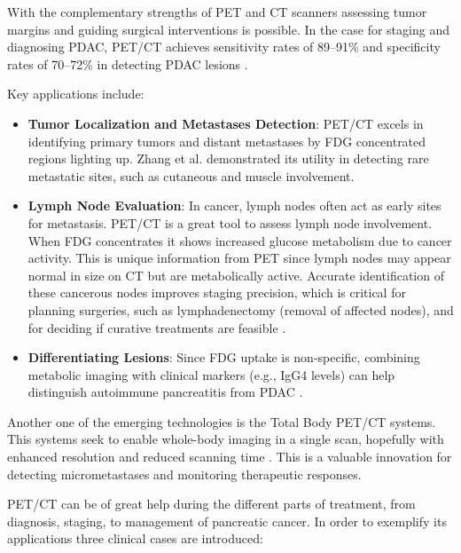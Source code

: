 \begin{multicols}{2}


With the complementary strengths of PET and CT scanners assessing tumor margins and guiding surgical interventions is possible. In the case for staging and diagnosing PDAC, PET/CT achieves sensitivity rates of 89–91\% and specificity rates of 70–72\% in detecting PDAC lesions \cite{TG174}.

Key applications include:
\begin{itemize}
	\item \textbf{Tumor Localization and Metastases Detection}: PET/CT excels in identifying primary tumors and distant metastases by FDG concentrated regions lighting up. Zhang et al. demonstrated its utility in detecting rare metastatic sites, such as cutaneous and muscle involvement\cite{Zhang2023}.
	\item \textbf{Lymph Node Evaluation}: In cancer, lymph nodes often act as early sites for metastasis. PET/CT is a great tool to assess lymph node involvement. When FDG concentrates it shows increased glucose metabolism due to cancer activity. This is unique information from PET since lymph nodes may appear normal in size on CT but are metabolically active. Accurate identification of these cancerous nodes improves staging precision, which is critical for planning surgeries, such as lymphadenectomy (removal of affected nodes), and for deciding if curative treatments are feasible \cite{TG174}.
	\item \textbf{Differentiating Lesions}: Since FDG uptake is non-specific, combining metabolic imaging with clinical markers (e.g., IgG4 levels) can help distinguish autoimmune pancreatitis from PDAC \cite{Zheng2018}.
\end{itemize}

Another one of the emerging technologies is the Total Body PET/CT systems. This systems seek to enable whole-body imaging in a single scan, hopefully with enhanced resolution and reduced scanning time \cite{SunderlandSeminar}. This is a valuable innovation for detecting micrometastases and monitoring therapeutic responses. %


PET/CT can be of great help during the different parts of treatment, from diagnosis, staging, to management of pancreatic cancer. In order to exemplify its applications three clinical cases are introduced:


\end{multicols}
